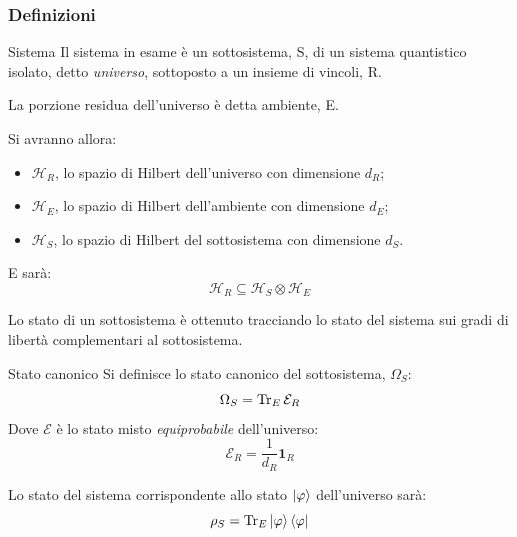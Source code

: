 \documentclass{beamer}
\theoremstyle{definition}
\theoremstyle{plain}
\begin{document}
\begin{frame}[allowframebreaks]
	\transpush[direction = 180]
	\frametitle{Definizioni}
	
	\begin{block}{Sistema}
		Il sistema in esame è un sottosistema, S, di un sistema quantistico isolato, detto \textit{universo}, sottoposto a un insieme di vincoli, R.
		
		La porzione residua dell'universo è detta ambiente, E.
	\end{block}
	
	Si avranno allora:
	\begin{itemize}
		\item $\mathcal{H}_R$, lo spazio di Hilbert dell'universo con dimensione $d_R$;
		\item $\mathcal{H}_E$, lo spazio di Hilbert dell'ambiente con dimensione $d_E$;
		\item $\mathcal{H}_S$, lo spazio di Hilbert del sottosistema con dimensione $d_S$.
	\end{itemize}
	
	E sarà:
	\begin{equation*}
	\mathcal{H}_R \subseteq \mathcal{H}_S \otimes \mathcal{H}_E
	\end{equation*}
	
	\pagebreak
	
	Lo stato di un sottosistema è ottenuto tracciando lo stato del sistema sui gradi di libertà complementari al sottosistema.
	\begin{block}{Stato canonico}
		Si definisce lo stato canonico del sottosistema, $\Omega_S$:
		\begin{equation*}
		\Omega_S = \Tr_E \mathcal{E}_R
		\end{equation*}
		Dove $\mathcal{E}$ è lo stato misto \textit{equiprobabile} dell'universo:
		\begin{equation*}
		\mathcal{E}_R = \frac{1}{d_R} \mathbf{1}_R
		\end{equation*}
	\end{block}
	
	Lo stato del sistema corrispondente allo stato $\ket{\varphi}$ dell'universo sarà:
	\begin{equation*}
	\rho_S = \Tr_E \ket{\varphi}\bra{\varphi}
	\end{equation*}
\end{frame}
\end{document}
